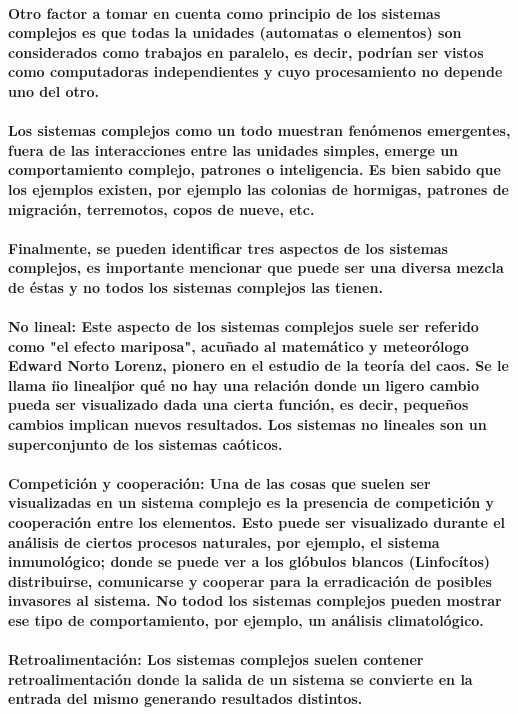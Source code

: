       \paragraph{Otro factor a tomar en cuenta como principio de los sistemas complejos es que todas la unidades (automatas o elementos) son considerados como trabajos en paralelo, es decir, podrían ser vistos como computadoras independientes y cuyo procesamiento no depende uno del otro.}
      \paragraph{Los sistemas complejos como un todo muestran fenómenos emergentes, fuera de las interacciones entre las unidades simples, emerge un comportamiento complejo, patrones o inteligencia. Es bien sabido que los ejemplos existen, por ejemplo las colonias de hormigas, patrones de migración, terremotos, copos de nueve, etc.}
      \paragraph{Finalmente, se pueden identificar tres aspectos de los sistemas complejos, es importante mencionar que puede ser una diversa mezcla de éstas y no todos los sistemas complejos las tienen.}
      \paragraph{\textbf{No lineal}: Este aspecto de los sistemas complejos suele ser referido como "el efecto mariposa", acuñado al matemático y meteorólogo Edward Norto Lorenz, pionero en el estudio de la teoría del caos. Se le llama \"no lineal\" por qué no hay una relación donde un ligero cambio pueda ser visualizado dada una cierta función, es decir, pequeños cambios implican nuevos resultados. Los sistemas no lineales son un superconjunto de los sistemas caóticos.}
      \paragraph{\textbf{Competición y cooperación}: Una de las cosas que suelen ser visualizadas en un sistema complejo es la presencia de competición y cooperación entre los elementos. Esto puede ser visualizado durante el análisis de ciertos procesos naturales, por ejemplo, el sistema inmunológico; donde se puede ver a los glóbulos blancos (Linfocítos) distribuirse, comunicarse y cooperar para la erradicación de posibles invasores al sistema. No todod los sistemas complejos pueden mostrar ese tipo de comportamiento, por ejemplo, un análisis climatológico.}
      \paragraph{\textbf{Retroalimentación}: Los sistemas complejos suelen contener retroalimentación donde la salida de un sistema se convierte en la entrada del mismo generando resultados distintos.}


